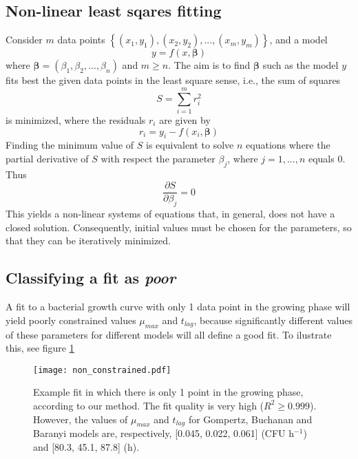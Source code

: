 \documentclass[titlepage,11pt]{article}
\begin{document}
\begin{linenumbers}
	\subsection{Non-linear least sqares fitting}\label{subsec:non-linear least squares fitting}
	Consider $ m $ data points $ \left\{(x_1, y_1), (x_2, y_2), ... , (x_m, y_m)\right\} $, and a model
	\begin{equation}
	y = f(x, \boldsymbol{\beta})
	\end{equation}
	where $ \boldsymbol{\beta} = (\beta_1, \beta_2, ... , \beta_n) $ and $ m \geq n $. The aim is to find $ \boldsymbol{\beta}$ such as the model $ y $ fits best the given data points in the least square sense, i.e., the sum of squares
	\begin{equation}
	S = \sum_{i = 1}^{m} r^2_i
	\end{equation}
	is minimized, where the residuals $ r_i $ are given by
	\begin{equation}
	r_i = y_i - f(x_i, \boldsymbol{\beta})
	\end{equation}
	Finding the minimum value of $ S $ is equivalent to solve $ n $ equations where the partial derivative of $ S $ with respect the parameter $ \beta_j $, where $ j = 1, ..., n $ equals 0. Thus
	\begin{equation}
	\frac{\partial S}{\partial \beta_j} = 0	
	\end{equation}
	This yields a non-linear systems of equations that, in general, does not have a closed solution. Consequently, initial values must be chosen for the parameters, so that they can be iteratively minimized. 
	\subsection{Classifying a fit as \textit{poor}}\label{subsec:poor}
	A fit to a bacterial growth curve with only 1 data point in the growing phase will yield poorly constrained values $ \mu_{max} $ and $t_{lag}$, because significantly different values of  these parameters for different models will all define a good fit. To ilustrate this, see figure \ref{fig:non_constrained}
	\begin{figure}[h]
		\texttt{[image: non\_constrained.pdf]}
		\centering
		\caption{Example fit in which there is only 1 point in the growing phase, according to our method. The fit quality is very high ($ R^2 \ge 0.999 $). However, the values of $ \mu_{max} $ and $ t_{lag} $ for Gompertz, Buchanan and Baranyi models are, respectively, [0.045, 0.022, 0.061] (CFU h$^{-1}$) and [80.3, 45.1, 87.8] (h).}
		\label{fig:non_constrained}
	\end{figure}
	

\end{linenumbers}
\end{document}
